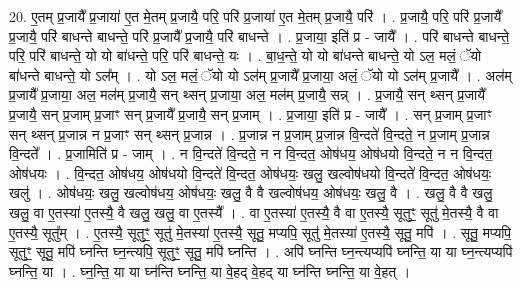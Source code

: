 \documentclass[17pt]{extarticle}
\begin{document}
20. ए॒तम् प्र॒जायै᳚ प्र॒जाया॑ ए॒त मे॒तम् प्र॒जायै॒ परि॒ परि॑ प्र॒जाया॑ ए॒त मे॒तम् प्र॒जायै॒ परि॑ । . प्र॒जायै॒ परि॒ परि॑ प्र॒जायै᳚ प्र॒जायै॒ परि॑ बाधन्ते बाधन्ते॒ परि॑ प्र॒जायै᳚ प्र॒जायै॒ परि॑ बाधन्ते । . प्र॒जाया॒ इति॑ प्र - जायै᳚ । . परि॑ बाधन्ते बाधन्ते॒ परि॒ परि॑ बाधन्ते॒ यो यो बा॑धन्ते॒ परि॒ परि॑ बाधन्ते॒ यः । . बा॒ध॒न्ते॒ यो यो बा॑धन्ते बाधन्ते॒ यो ऽल॒ मलं॒ ॅयो बा॑धन्ते बाधन्ते॒ यो ऽल᳚म् । . यो ऽल॒ मलं॒ ॅयो यो ऽल॑म् प्र॒जायै᳚ प्र॒जाया॒ अलं॒ ॅयो यो ऽल॑म् प्र॒जायै᳚ । . अल॑म् प्र॒जायै᳚ प्र॒जाया॒ अल॒ मल॑म् प्र॒जायै॒ सन् थ्सन् प्र॒जाया॒ अल॒ मल॑म् प्र॒जायै॒ सन्न् । . प्र॒जायै॒ सन् थ्सन् प्र॒जायै᳚ प्र॒जायै॒ सन् प्र॒जाम् प्र॒जाꣳ सन् प्र॒जायै᳚ प्र॒जायै॒ सन् प्र॒जाम् । . प्र॒जाया॒ इति॑ प्र - जायै᳚ । . सन् प्र॒जाम् प्र॒जाꣳ सन् थ्सन् प्र॒जान्न न प्र॒जाꣳ सन् थ्सन् प्र॒जान्न । . प्र॒जान्न न प्र॒जाम् प्र॒जान्न वि॒न्दते॑ वि॒न्दते॒ न प्र॒जाम् प्र॒जान्न वि॒न्दते᳚ । . प्र॒जामिति॑ प्र - जाम् । . न वि॒न्दते॑ वि॒न्दते॒ न न वि॒न्दत॒ ओष॑धय॒ ओष॑धयो वि॒न्दते॒ न न वि॒न्दत॒ ओष॑धयः । . वि॒न्दत॒ ओष॑धय॒ ओष॑धयो वि॒न्दते॑ वि॒न्दत॒ ओष॑धयः॒ खलु॒ खल्वोष॑धयो वि॒न्दते॑ वि॒न्दत॒ ओष॑धयः॒ खलु॑ । . ओष॑धयः॒ खलु॒ खल्वोष॑धय॒ ओष॑धयः॒ खलु॒ वै वै खल्वोष॑धय॒ ओष॑धयः॒ खलु॒ वै । . खलु॒ वै वै खलु॒ खलु॒ वा ए॒तस्या॑ ए॒तस्यै॒ वै खलु॒ खलु॒ वा ए॒तस्यै᳚ । . वा ए॒तस्या॑ ए॒तस्यै॒ वै वा ए॒तस्यै॒ सूतुꣳ॒॒ सूतु॑ मे॒तस्यै॒ वै वा ए॒तस्यै॒ सूतु᳚म् । . ए॒तस्यै॒ सूतुꣳ॒॒ सूतु॑ मे॒तस्या॑ ए॒तस्यै॒ सूतु॒ मप्यपि॒ सूतु॑ मे॒तस्या॑ ए॒तस्यै॒ सूतु॒ मपि॑ । . सूतु॒ मप्यपि॒ सूतुꣳ॒॒ सूतु॒ मपि॑ घ्नन्ति घ्न॒न्त्यपि॒ सूतुꣳ॒॒ सूतु॒ मपि॑ घ्नन्ति । . अपि॑ घ्नन्ति घ्न॒न्त्यप्यपि॑ घ्नन्ति॒ या या घ्न॒न्त्यप्यपि॑ घ्नन्ति॒ या । . घ्न॒न्ति॒ या या घ्न॑न्ति घ्नन्ति॒ या वे॒हद् वे॒हद् या घ्न॑न्ति घ्नन्ति॒ या वे॒हत् । \newline
\end{document}

